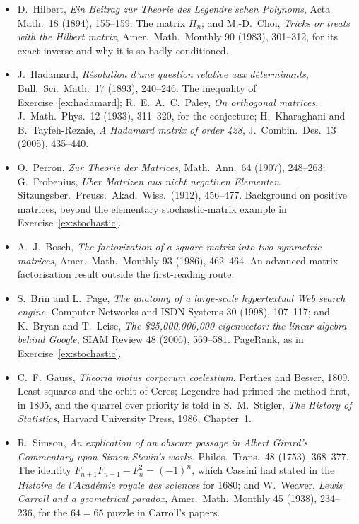 \begin{itemize}
\item D.~Hilbert, \emph{Ein Beitrag zur Theorie des Legendre'schen Polynoms}, Acta Math.\ 18 (1894), 155--159. The matrix $H_n$; and M.-D.~Choi, \emph{Tricks or treats with the Hilbert matrix}, Amer.\ Math.\ Monthly 90 (1983), 301--312, for its exact inverse and why it is so badly conditioned.
\item J.~Hadamard, \emph{R\'esolution d'une question relative aux d\'eterminants}, Bull.\ Sci.\ Math.\ 17 (1893), 240--246. The inequality of Exercise~\ref{ex:hadamard}; R.~E.~A.~C.~Paley, \emph{On orthogonal matrices}, J.\ Math.\ Phys.\ 12 (1933), 311--320, for the conjecture; H.~Kharaghani and B.~Tayfeh-Rezaie, \emph{A Hadamard matrix of order 428}, J.\ Combin.\ Des.\ 13 (2005), 435--440.
\item O.~Perron, \emph{Zur Theorie der Matrices}, Math.\ Ann.\ 64 (1907), 248--263; G.~Frobenius, \emph{\"Uber Matrizen aus nicht negativen Elementen}, Sitzungsber.\ Preuss.\ Akad.\ Wiss.\ (1912), 456--477. Background on positive matrices, beyond the elementary stochastic-matrix example in Exercise~\ref{ex:stochastic}.
\item A.~J.~Bosch, \emph{The factorization of a square matrix into two symmetric matrices}, Amer.\ Math.\ Monthly 93 (1986), 462--464. An advanced matrix factorisation result outside the first-reading route.
\item S.~Brin and L.~Page, \emph{The anatomy of a large-scale hypertextual Web search engine}, Computer Networks and ISDN Systems 30 (1998), 107--117; and K.~Bryan and T.~Leise, \emph{The \$25{,}000{,}000{,}000 eigenvector: the linear algebra behind Google}, SIAM Review 48 (2006), 569--581. PageRank, as in Exercise~\ref{ex:stochastic}.
\item C.~F.~Gauss, \emph{Theoria motus corporum coelestium}, Perthes and Besser, 1809. Least squares and the orbit of Ceres; Legendre had printed the method first, in 1805, and the quarrel over priority is told in S.~M.~Stigler, \emph{The History of Statistics}, Harvard University Press, 1986, Chapter~1.
\item R.~Simson, \emph{An explication of an obscure passage in Albert Girard's Commentary upon Simon Stevin's works}, Philos.\ Trans.\ 48 (1753), 368--377. The identity $F_{n+1}F_{n-1}-F_n^2=(-1)^n$, which Cassini had stated in the \emph{Histoire de l'Acad\'emie royale des sciences} for 1680; and W.~Weaver, \emph{Lewis Carroll and a geometrical paradox}, Amer.\ Math.\ Monthly 45 (1938), 234--236, for the $64=65$ puzzle in Carroll's papers.
\end{itemize}
